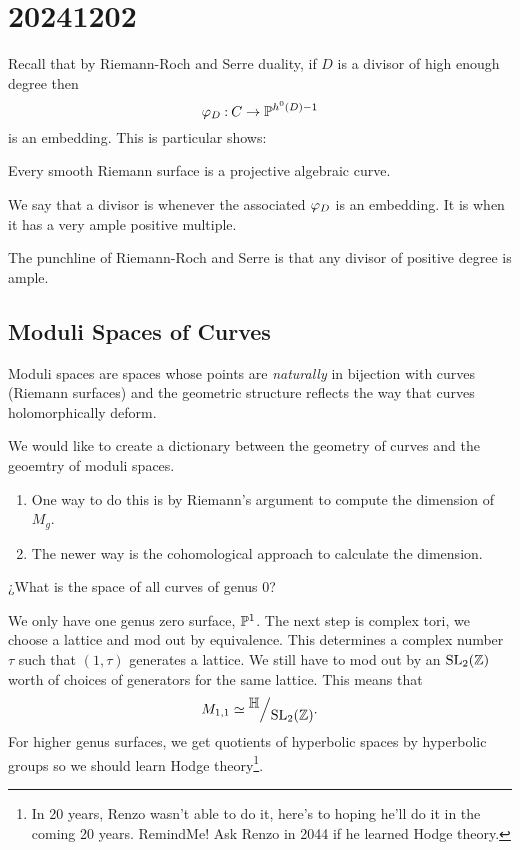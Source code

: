 \documentclass[12pt]{memoir}
\begin{document}
\section{20241202}

Recall that by Riemann-Roch and Serre duality, if $D$ is a divisor of high enough degree then 
$$\varphi_D\mathbin{:} C\to\mathbb{P}^{h^0(D)-1}$$
is an embedding. This is particular shows:

\begin{Cor}
    Every smooth Riemann surface is a projective algebraic curve.
\end{Cor}

\begin{Def}
    We say that a divisor is  whenever the associated $\varphi_D$ is an embedding. It is  when it has a very ample positive multiple.
\end{Def}

The punchline of Riemann-Roch and Serre is that any divisor of positive degree is ample. 

\subsection{Moduli Spaces of Curves}

Moduli spaces are spaces whose points are \emph{naturally} in bijection with curves (Riemann surfaces) and the geometric structure reflects the way that curves holomorphically deform.\par
We would like to create a dictionary between the geometry of curves and the geoemtry of moduli spaces. 
\begin{enumerate}
    \item One way to do this is by Riemann's argument to compute the dimension of $M_g$.
    \item The newer way is the cohomological approach to calculate the dimension.
\end{enumerate}

\begin{significant}
    ¿What is the space of all curves of genus $0$?
\end{significant}

We only have one genus zero surface, $\mathbb{P}^1$. The next step is complex tori, we choose a lattice and mod out by equivalence. This determines a complex number $\tau$ such that $(1,\tau)$ generates a lattice. We still have to mod out by an $\mathrm{SL}_2(\mathbb{Z})$ worth of choices of generators for the same lattice. This means that 
$$M_{1,1}\isom\quot{\bH}{\rSL_2(\bZ)}.$$
For higher genus surfaces, we get quotients of hyperbolic spaces by hyperbolic groups so we should learn Hodge theory\footnote{In 20 years, Renzo wasn't able to do it, here's to hoping he'll do it in the coming 20 years. RemindMe! Ask Renzo in 2044 if he learned Hodge theory.}.
\end{document}
